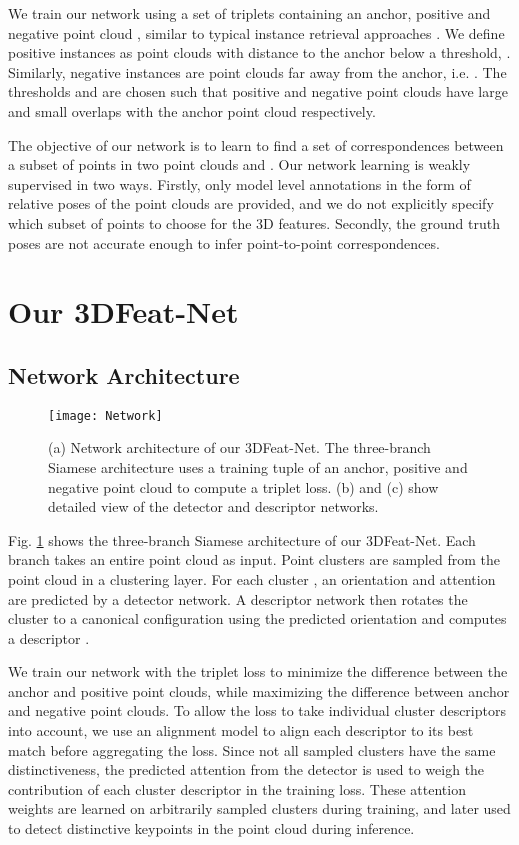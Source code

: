 \documentclass[runningheads]{llncs}
\begin{document}
We train our network using a set of triplets containing an anchor, positive and negative point cloud  , similar to typical instance retrieval approaches \cite{arandjelovic2016netvlad,gordo2016deepimageretrieval}. 
We define positive instances as point clouds with distance to the anchor below a threshold, . Similarly, negative instances are point clouds far away from the anchor, i.e. . The thresholds  and  are chosen such that positive and negative point clouds have large and small overlaps with the anchor point cloud respectively.

The objective of our network is to learn to find a set of correspondences  between a subset of points in two point clouds  and . Our network learning is weakly supervised in two ways. Firstly, only model level annotations in the form of relative poses of the point clouds are provided, and we do not explicitly specify which subset of points to choose for the 3D features. Secondly, the ground truth poses are not accurate enough to infer point-to-point correspondences.

\section{Our 3DFeat-Net}

\subsection{Network Architecture}
\begin{figure}[t]
\centering
\texttt{[image: Network]}
\caption{(a) Network architecture of our 3DFeat-Net. The three-branch Siamese architecture uses a training tuple of an anchor, positive and negative point cloud to compute a triplet loss. (b) and (c) show detailed view of the detector and descriptor networks.}
\label{fig:architecture}
\end{figure}

Fig. \ref{fig:architecture} shows the three-branch Siamese architecture of our 3DFeat-Net. Each branch takes an entire point cloud  as input. Point clusters  are sampled from the point cloud in a clustering layer.
For each cluster , an orientation  and attention  \cite{delf} are predicted by a detector network.
A descriptor network then rotates the cluster  to a canonical configuration
using the predicted orientation  and computes a descriptor .

We train our network with the triplet loss to minimize the difference between the anchor and positive point clouds, while maximizing the difference between anchor and negative point clouds. To allow the loss to take individual cluster descriptors  into account, we use an alignment model \cite{karpathy2015alignment} to align each descriptor to its best match before aggregating the loss. Since not all sampled clusters have the same distinctiveness, the predicted attention  from the detector is used to weigh the contribution of each cluster descriptor in the training loss. These attention weights are learned on arbitrarily sampled clusters during training, and later used to detect distinctive keypoints in the point cloud during inference.
\end{document}
